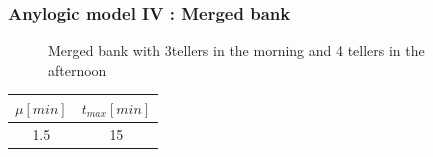 \documentclass[10pt]{beamer}
\begin{document}
\begin{frame}
  \frametitle{Anylogic model IV : Merged bank}
  \begin{figure}
  \centering
{}

\caption{Merged bank with 3tellers in the morning and 4 tellers in the afternoon}
\end{figure}
  
  
\begin{table}
\centering
\begin{tabular}{|c|c|}
\hline
$\mu[min]$ & $t_{max}[min]$ \\
\hline
1.5 & 15 \\
\hline
\end{tabular} 
\end{table}

\end{frame}
\end{document}

